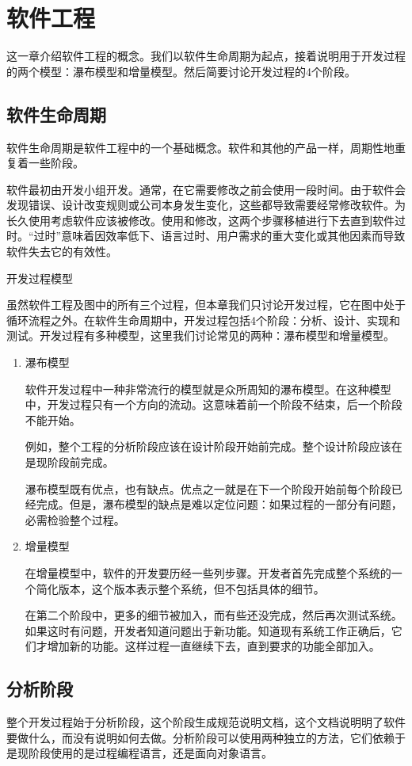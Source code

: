 \chapter{软件工程}
这一章介绍软件工程的概念。我们以软件生命周期为起点，接着说明用于开发过程的两个模型：瀑布模型和增量模型。然后简要讨论开发过程的4个阶段。
\section{软件生命周期}
软件生命周期是软件工程中的一个基础概念。软件和其他的产品一样，周期性地重复着一些阶段。

软件最初由开发小组开发。通常，在它需要修改之前会使用一段时间。由于软件会发现错误、设计改变规则或公司本身发生变化，这些都导致需要经常修改软件。为长久使用考虑软件应该被修改。使用和修改，这两个步骤移植进行下去直到软件过时。“过时”意味着因效率低下、语言过时、用户需求的重大变化或其他因素而导致软件失去它的有效性。

开发过程模型

虽然软件工程及图中的所有三个过程，但本章我们只讨论开发过程，它在图中处于循环流程之外。在软件生命周期中，开发过程包括4个阶段：分析、设计、实现和测试。开发过程有多种模型，这里我们讨论常见的两种：瀑布模型和增量模型。
\begin{enumerate}
	\item 瀑布模型

	软件开发过程中一种非常流行的模型就是众所周知的瀑布模型。在这种模型中，开发过程只有一个方向的流动。这意味着前一个阶段不结束，后一个阶段不能开始。

	例如，整个工程的分析阶段应该在设计阶段开始前完成。整个设计阶段应该在是现阶段前完成。

	瀑布模型既有优点，也有缺点。优点之一就是在下一个阶段开始前每个阶段已经完成。但是，瀑布模型的缺点是难以定位问题：如果过程的一部分有问题，必需检验整个过程。
	\item 增量模型

	在增量模型中，软件的开发要历经一些列步骤。开发者首先完成整个系统的一个简化版本，这个版本表示整个系统，但不包括具体的细节。

	在第二个阶段中，更多的细节被加入，而有些还没完成，然后再次测试系统。如果这时有问题，开发者知道问题出于新功能。知道现有系统工作正确后，它们才增加新的功能。这样过程一直继续下去，直到要求的功能全部加入。
\end{enumerate}
\section{分析阶段}
整个开发过程始于分析阶段，这个阶段生成规范说明文档，这个文档说明明了软件要做什么，而没有说明如何去做。分析阶段可以使用两种独立的方法，它们依赖于是现阶段使用的是过程编程语言，还是面向对象语言。
